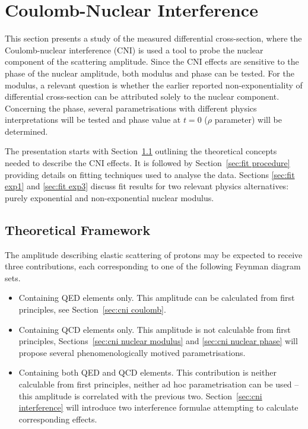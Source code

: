 \section{Coulomb-Nuclear Interference}
\label{sec:coulomb}

This section presents a study of the measured differential cross-section, where the Coulomb-nuclear interference (CNI) is used a tool to probe the nuclear component of the scattering amplitude. Since the CNI effects are sensitive to the phase of the nuclear amplitude, both modulus and phase can be tested. For the modulus, a relevant question is whether the earlier reported non-exponentiality of differential cross-section \cite{8tev-90m} can be attributed solely to the nuclear component. Concerning the phase, several parametrisations with different physics interpretations will be tested and phase value at $t = 0$ ($\rho$ parameter) will be determined.

The presentation starts with Section~\ref{sec:cni framework} outlining the theoretical concepts needed to describe the CNI effects. It is followed by Section~\ref{sec:fit procedure} providing details on fitting techniques used to analyse the data. Sections \ref{sec:fit exp1} and \ref{sec:fit exp3} discuss fit results for two relevant physics alternatives: purely exponential and non-exponential nuclear modulus.




\subsection{Theoretical Framework}
\label{sec:cni framework}

The amplitude describing elastic scattering of protons may be expected to receive three contributions, each corresponding to one of the following Feynman diagram sets.
\begin{itemize}
\item Containing QED elements only. This amplitude can be calculated from first principles, see Section~\ref{sec:cni coulomb}.
\item Containing QCD elements only. This amplitude is not calculable from first principles, Sections~\ref{sec:cni nuclear modulus} and \ref{sec:cni nuclear phase} will propose several phenomenologically motived parametrisations.
\item Containing both QED and QCD elements. This contribution is neither calculable from first principles, neither ad hoc parametrisation can be used -- this amplitude is correlated with the previous two. Section~\ref{sec:cni interference} will introduce two interference formulae attempting to calculate corresponding effects.
\end{itemize}


